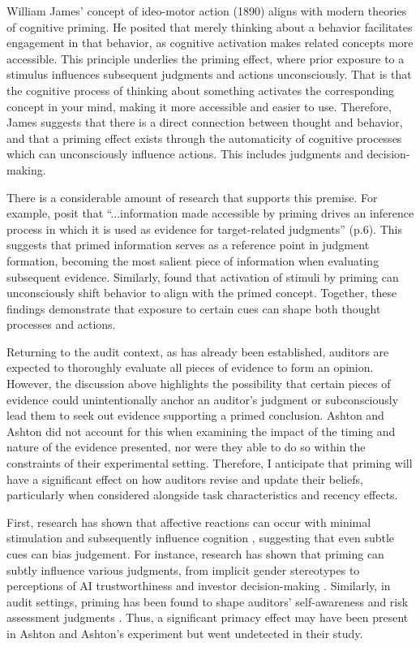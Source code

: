 \documentclass[12pt,english]{article}
\begin{document}
William James’ concept of ideo-motor action (1890) aligns with modern theories of cognitive priming. He posited that merely thinking about a behavior facilitates engagement in that behavior, as cognitive activation makes related concepts more accessible. This principle underlies the priming effect, where prior exposure to a stimulus influences subsequent judgments and actions unconsciously. That is that the cognitive process of thinking about something activates the corresponding concept in your mind, making it more accessible and easier to use. Therefore, James suggests that there is a direct connection between thought and behavior, and that a priming effect exists through the automaticity of cognitive processes which can unconsciously influence actions. This includes judgments and decision-making.

There is a considerable amount of research that supports this premise. For example, \citet{loersch2016} posit that “...information made accessible by priming drives an inference process in which it is used as evidence for target-related judgments” (p.6). This suggests that primed information serves as a reference point in judgment formation, becoming the most salient piece of information when evaluating subsequent evidence. Similarly, \citet{bargh1996} found that activation of stimuli by priming can unconsciously shift behavior to align with the primed concept. Together, these findings demonstrate that exposure to certain cues can shape both thought processes and actions. 

Returning to the audit context, as has already been established, auditors are expected to thoroughly evaluate all pieces of evidence to form an opinion. However, the discussion above highlights the possibility that certain pieces of evidence could unintentionally anchor an auditor’s judgment or subconsciously lead them to seek out evidence supporting a primed conclusion. Ashton and Ashton did not account for this when examining the impact of the timing and nature of the evidence presented, nor were they able to do so within the constraints of their experimental setting. Therefore, I anticipate that priming will have a significant effect on how auditors revise and update their beliefs, particularly when considered alongside task characteristics and recency effects. 

First, research has shown that affective reactions can occur with minimal stimulation and subsequently influence cognition \citep{zajonc1980, murphy1993}, suggesting that even subtle cues can bias judgement. For instance, research has shown that priming can subtly influence various judgments, from implicit gender stereotypes \citep{rudman2010} to perceptions of AI trustworthiness \citep{pataranutaporn2023} and investor decision-making \citep{kilger2012}. Similarly, in audit settings, priming has been found to shape auditors' self-awareness \citep{bambani2017} and risk assessment judgments \citep{hammersley2010}. Thus, a significant primacy effect may have been present in Ashton and Ashton’s experiment but went undetected in their study.
\end{document}
